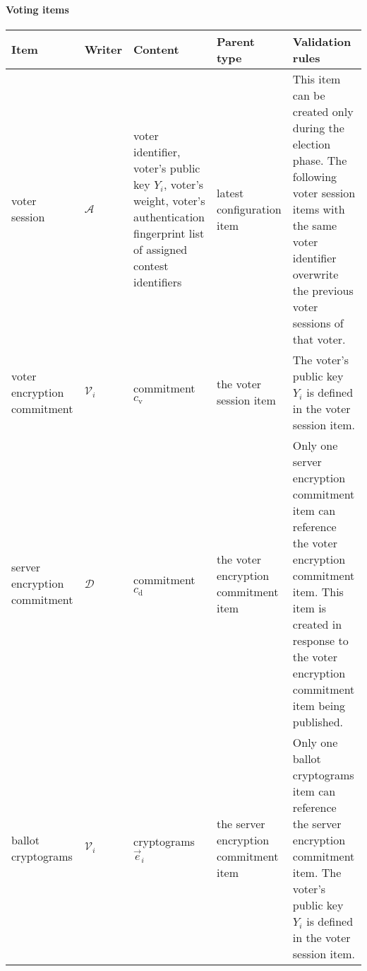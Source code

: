 \begin{landscape}
\clearpage
\paragraph{Voting items}
\begin{longtable}{|
    >{\raggedright}p{} |
    >{\centering}p{} |
    >{\raggedright}p{} |
    >{\raggedright}p{} |
    p{} |
} 
    \hline
    \textbf{Item} &
    \textbf{Writer} &
    \textbf{Content} &
    \textbf{Parent type} &
    \textbf{Validation rules} \\
    \hline
    \endhead

    voter session &
    $\mathcal{A}$ &
    voter identifier, \newline voter's public key $Y_i$, \newline voter's weight, \newline voter's authentication fingerprint \newline list of assigned contest identifiers &
    latest configuration item &
    This item can be created only during the election phase. \newline The following voter session items with the same voter identifier overwrite the previous voter sessions of that voter.
    \\ \hline

    voter encryption commitment &
    $\mathcal{V}_i$ &
    commitment $c_\mathrm{v}$ &
    the voter session item &
    The voter's public key $Y_i$ is defined in the voter session item.
    \\ \hline

    server encryption commitment &
    $\mathcal{D}$ &
    commitment $c_\mathrm{d}$ &
    the voter encryption commitment item &
    Only one server encryption commitment item can reference the voter encryption commitment item. \newline This item is created in response to the voter encryption commitment item being published.
    \\ \hline

    ballot cryptograms &
    $\mathcal{V}_i$ &
    cryptograms $\vec{e}_i$ &
    the server encryption commitment item &
    Only one ballot cryptograms item can reference the server encryption commitment item. \newline The voter's public key $Y_i$ is defined in the voter session item.
    \\ \hline


\end{longtable}
\end{landscape}
